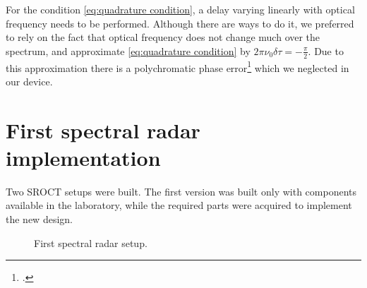 \documentclass[12pt,twoside,english]{book}
\renewcommand{\~}{\perispomeni}%
\DeclareRobustCommand{\textgreek}[1]{\leavevmode{\greektext #1}}
\numberwithin{equation}{section}
\numberwithin{figure}{section}
\begin{document}
For the condition \ref{eq:quadrature condition}, a delay varying linearly with optical frequency needs to be performed. Although there are ways to do it, we preferred to rely on the fact that optical frequency does not change much over the spectrum, and approximate \ref{eq:quadrature condition} by $2\pi\nu_0\delta\tau=-\frac{\pi}{2}$. Due to this approximation there is a polychromatic phase error\footcite{Leitgeb:2003p1779} which we neglected in our device.



\section{First spectral radar implementation}
\label{section:Spectral radar implementation}

Two \gls{SROCT} setups were built. The first version was built only with components available in the laboratory, while the required parts were acquired to implement the new design.  


\begin{figure}[h]
\small
\centering
\caption{First spectral radar setup.}
\label{fig:SROCT setup 1}
\end{figure}
\end{document}

